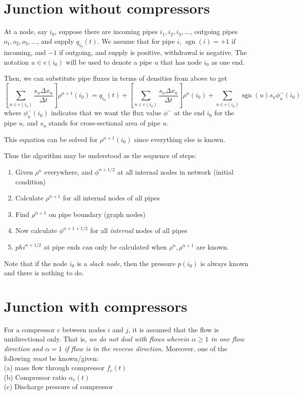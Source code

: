 \documentclass{amsart}
\DeclareMathOperator{\sgn}{sgn}
\begin{document}
\section{Junction without compressors}

At a node, say $i_0$, suppose there are incoming pipes $i_1, i_2, i_3, \dotsc$, outgoing pipes $o_1, o_2, o_3, ...$, and supply $q_{i_0}(t)$. We assume that for pipe $i$, $\sgn(i) = +1$ if incoming, and $-1$ if outgoing, and supply is positive, withdrawal is negative. The notation $u \in e(i_0)$ will be used to denote a pipe $u$ that has node $i_0$ as one end. 

Then, we can substitute pipe fluxes in terms of densities from above to get
\begin{equation}
\left[\sum_{u \in e(i_0)}\frac{s_u \Delta x_u}{\Delta t}\right]\rho^{n+1}(i_0) = q_{i_0}(t) + \left[\sum_{u \in e(i_0)}\frac{s_u \Delta x_u}{\Delta t}\right]\rho^{n}(i_0) + \sum_{u \in e(i_0)}\sgn(u) s_u \phi_{u}^-(i_0) 
\end{equation}
where $\phi_{u}^-(i_0)$ indicates that we want the flux value $\phi^-$ at the end $i_0$ for the pipe $u$, and $s_u$ stands for cross-sectional area of pipe $u$.

This equation can be solved for $\rho^{n+1}(i_0)$ since everything else is known.

Thus the algorithm may be understood as the sequence of steps:
\begin{enumerate}
\item Given $\rho^n$ everywhere, and $\phi^{n+1/2}$ at all internal nodes in network (initial condition)	
 \item Calculate $\rho^{n+1}$ for all internal nodes of all pipes 
 \item Find $\rho^{n+1}$ on pipe boundary (graph nodes)
 \item Now calculate $\phi^{n+1 + 1/2}$ for all \emph{internal} nodes of all pipes
 \item $phi^{n+1/2}$ at pipe ends can only be calculated when $\rho^n, \rho^{n+1}$ are known.
 \end{enumerate} 
Note that if the node $i_0$ is a \emph{slack node}, then the pressure $p(i_0)$ is always known and there is nothing to do.


\section{Junction with compressors}
For a compressor $c$ between nodes $i$ and $j$, it is assumed that the flow is unidirectional only. That is, \emph{we do not deal with flows wherein $\alpha \geq 1$ in one flow direction and $\alpha=1$  if  flow is in the reverse direction.} 
Moreover, one of the following \emph{must} be known/given: \\
(a) mass flow through compressor $f_c(t)$ \\
(b) Compressor ratio $\alpha_c(t)$ \\
(c) Discharge pressure of compressor \\ 
\end{document}
